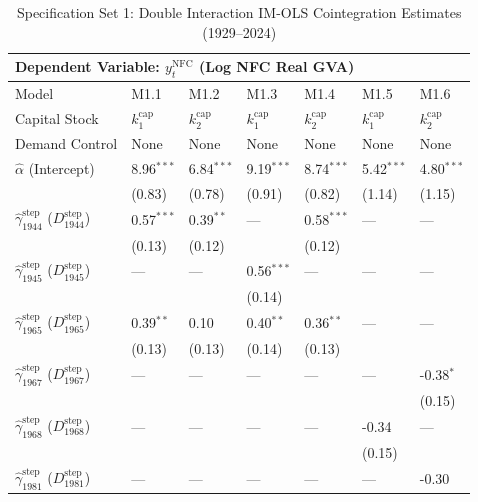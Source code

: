 \begin{table}[H]
\centering
\caption{Specification Set 1: Double Interaction IM-OLS Cointegration Estimates (1929--2024)}
\label{tab:spec_set_1}
\scriptsize
\begin{tabular}{p{3.8cm}p{1.35cm}p{1.35cm}p{1.35cm}p{1.35cm}p{1.35cm}p{1.35cm}}
\toprule
\multicolumn{7}{l}{\textbf{Dependent Variable: $y_t^{\text{NFC}}$ (Log NFC Real GVA)}} \\
\midrule
Model & M1.1 & M1.2 & M1.3 & M1.4 & M1.5 & M1.6  \\
Capital Stock & $k^{\text{cap}}_1$ & $k^{\text{cap}}_2$ & $k^{\text{cap}}_1$ & $k^{\text{cap}}_2$ & $k^{\text{cap}}_1$ & $k^{\text{cap}}_2$  \\
Demand Control & None & None & None & None & None & None  \\
\midrule
$\hat{\alpha}$ (Intercept)  & 8.96$^{***}$ & 6.84$^{***}$ & 9.19$^{***}$ & 8.74$^{***}$ & 5.42$^{***}$ & 4.80$^{***}$  \\
 & {\scriptsize (0.83)} & {\scriptsize (0.78)} & {\scriptsize (0.91)} & {\scriptsize (0.82)} & {\scriptsize (1.14)} & {\scriptsize (1.15)}  \\
$\hat{\gamma}^{\text{step}}_{1944}$ ($D^{\text{step}}_{1944}$)  & 0.57$^{***}$ & 0.39$^{**}$ & --- & 0.58$^{***}$ & --- & ---  \\
 & {\scriptsize (0.13)} & {\scriptsize (0.12)} &  & {\scriptsize (0.12)} &  &   \\
$\hat{\gamma}^{\text{step}}_{1945}$ ($D^{\text{step}}_{1945}$)  & --- & --- & 0.56$^{***}$ & --- & --- & ---  \\
 &  &  & {\scriptsize (0.14)} &  &  &   \\
$\hat{\gamma}^{\text{step}}_{1965}$ ($D^{\text{step}}_{1965}$)  & 0.39$^{**}$ & 0.10 & 0.40$^{**}$ & 0.36$^{**}$ & --- & ---  \\
 & {\scriptsize (0.13)} & {\scriptsize (0.13)} & {\scriptsize (0.14)} & {\scriptsize (0.13)} &  &   \\
$\hat{\gamma}^{\text{step}}_{1967}$ ($D^{\text{step}}_{1967}$)  & --- & --- & --- & --- & --- & -0.38$^{*}$  \\
 &  &  &  &  &  & {\scriptsize (0.15)}  \\
$\hat{\gamma}^{\text{step}}_{1968}$ ($D^{\text{step}}_{1968}$)  & --- & --- & --- & --- & -0.34 & ---  \\
 &  &  &  &  & {\scriptsize (0.15)} &   \\
$\hat{\gamma}^{\text{step}}_{1981}$ ($D^{\text{step}}_{1981}$)  & --- & --- & --- & --- & --- & -0.30  \\

\end{tabular}
\end{table}
